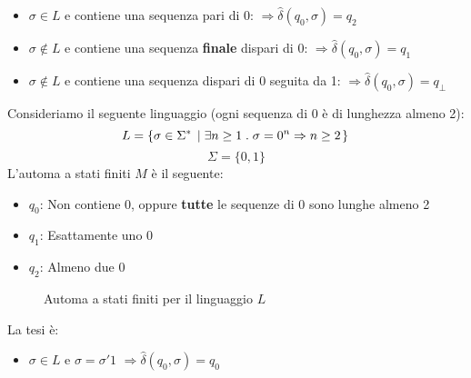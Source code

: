 \documentclass[a4paper]{article}
\begin{document}
\begin{exercise}
\begin{itemize}
    \item \( \sigma \in L \) e contiene una sequenza pari di 0:
      \(
        \Rightarrow \hat{\delta}(q_0, \sigma) = q_2
      \)

    \item \( \sigma \notin L \) e contiene una sequenza \textbf{finale} dispari di 0:
      \(
        \Rightarrow \hat{\delta}(q_0, \sigma) = q_1
      \)

    \item \( \sigma \notin L \) e contiene una sequenza dispari di 0 seguita da 1:
      \(
        \Rightarrow \hat{\delta}(q_0, \sigma) = q_{\bot}
      \)
  \end{itemize}
\end{exercise}
\begin{exercise}
  Consideriamo il seguente linguaggio (ogni sequenza di 0 è di lunghezza almeno 2):
  \[
    L = \left\{ \sigma \in \Sigma^* \;\left|\; \exists n \ge 1 \;.\; \sigma = 0^n \Rightarrow n \ge 2 \right.\right\}\\
  \] 
  \[
    \Sigma = \{0,1\}
  \]
  L'automa a stati finiti \( M \) è il seguente:
  \begin{itemize}
    \item \( q_0 \): Non contiene 0, oppure \textbf{tutte} le sequenze di 0
      sono lunghe almeno 2

    \item \( q_1 \): Esattamente uno 0
      
    \item \( q_2 \): Almeno due 0
  \end{itemize}
  \begin{figure}[H]
    \centering
    \caption{Automa a stati finiti per il linguaggio \( L \)}
  \end{figure}
  \noindent
  La tesi è:
  \begin{itemize}
    \item \( \sigma \in L \) e \( \sigma = \sigma'1 \)
      \(
        \Rightarrow \hat{\delta}(q_0, \sigma) = q_0
      \) 


\end{itemize}
\end{exercise}
\end{document}
